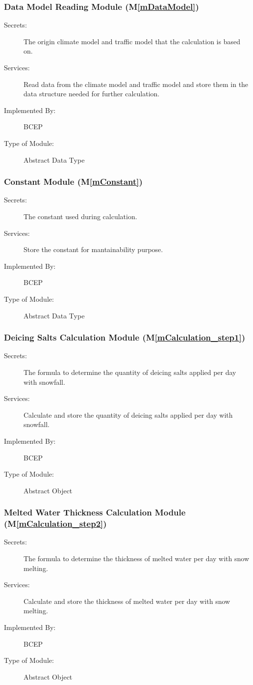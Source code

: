 \documentclass[12pt, titlepage]{article}
\newcommand{\mref}[1]{M\ref{#1}}
\begin{document}
\subsubsection{Data Model Reading Module (\mref{mDataModel})}
\begin{description}
\item[Secrets:] The origin climate model and traffic model that the calculation is based on.
\item[Services:]  Read data from the climate model and traffic model and store them in the data structure needed for further calculation.
\item[Implemented By:] BCEP
\item[Type of Module:] Abstract Data Type
\end{description}


\subsubsection{Constant Module (\mref{mConstant})}
\begin{description}
\item[Secrets:] The constant used during calculation.
\item[Services:] Store the constant for mantainability purpose.
\item[Implemented By:] BCEP
\item[Type of Module:] Abstract Data Type
\end{description}

\subsubsection{Deicing Salts Calculation Module (\mref{mCalculation_step1})}
\begin{description}
\item[Secrets:] The formula to determine the quantity of deicing salts applied per day with snowfall.
\item[Services:] Calculate and store the quantity of deicing salts applied per day with snowfall.
\item[Implemented By:] BCEP
\item[Type of Module:] Abstract Object
\end{description}

\subsubsection{Melted Water Thickness Calculation Module (\mref{mCalculation_step2})}
\begin{description}
\item[Secrets:] The formula to determine the thickness of melted water per day with snow melting.
\item[Services:] Calculate and store the thickness of melted water per day with snow melting.
\item[Implemented By:] BCEP
\item[Type of Module:] Abstract Object
\end{description}
\end{document}
